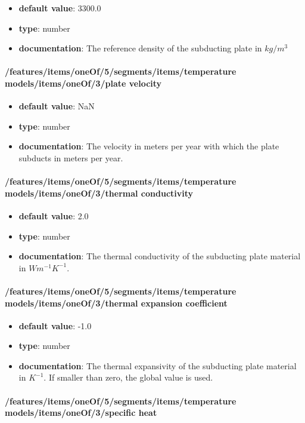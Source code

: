 \begin{itemize}\item {\bf default value}: 3300.0
\item {\bf type}: number
\item {\bf documentation}: The reference density of the subducting plate in $kg/m^3$
\end{itemize}\paragraph{/features/items/oneOf/5/segments/items/temperature models/items/oneOf/3/plate velocity}
\begin{itemize}\item {\bf default value}: NaN
\item {\bf type}: number
\item {\bf documentation}: The velocity in meters per year with which the plate subducts in meters per year.
\end{itemize}\paragraph{/features/items/oneOf/5/segments/items/temperature models/items/oneOf/3/thermal conductivity}
\begin{itemize}\item {\bf default value}: 2.0
\item {\bf type}: number
\item {\bf documentation}: The thermal conductivity of the subducting plate material in $W m^{-1} K^{-1}$.
\end{itemize}\paragraph{/features/items/oneOf/5/segments/items/temperature models/items/oneOf/3/thermal expansion coefficient}
\begin{itemize}\item {\bf default value}: -1.0
\item {\bf type}: number
\item {\bf documentation}: The thermal expansivity of the subducting plate material in $K^{-1}$. If smaller than zero, the global value is used.
\end{itemize}\paragraph{/features/items/oneOf/5/segments/items/temperature models/items/oneOf/3/specific heat}
